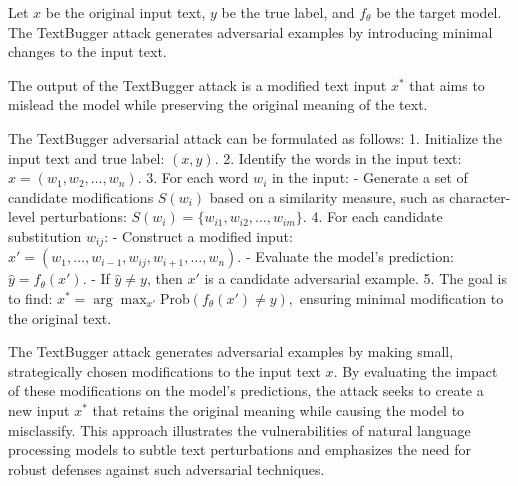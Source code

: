 
Let \( x \) be the original input text, \( y \) be the true label, and \( f_{\theta} \) be the target model. The TextBugger attack generates adversarial examples by introducing minimal changes to the input text.

The output of the TextBugger attack is a modified text input \( x^* \) that aims to mislead the model while preserving the original meaning of the text.

The TextBugger adversarial attack can be formulated as follows:
1. Initialize the input text and true label:
   $
   (x, y).
   $
2. Identify the words in the input text:
   $
   x = (w_1, w_2, \ldots, w_n).
   $
3. For each word \( w_i \) in the input:
   - Generate a set of candidate modifications \( S(w_i) \) based on a similarity measure, such as character-level perturbations:
   $
   S(w_i) = \{w_{i1}, w_{i2}, \ldots, w_{im}\}.
   $
4. For each candidate substitution \( w_{ij} \):
   - Construct a modified input:
   $
   x' = (w_1, \ldots, w_{i-1}, w_{ij}, w_{i+1}, \ldots, w_n).
   $
   - Evaluate the model's prediction:
   $
   \hat{y} = f_{\theta}(x').
   $
   - If \( \hat{y} \neq y \), then \( x' \) is a candidate adversarial example.
5. The goal is to find:
   $
   x^* = \arg\max_{x'} \text{Prob}(f_{\theta}(x') \neq y),
   $
   ensuring minimal modification to the original text.

The TextBugger attack generates adversarial examples by making small, strategically chosen modifications to the input text \( x \). By evaluating the impact of these modifications on the model's predictions, the attack seeks to create a new input \( x^* \) that retains the original meaning while causing the model to misclassify. This approach illustrates the vulnerabilities of natural language processing models to subtle text perturbations and emphasizes the need for robust defenses against such adversarial techniques.